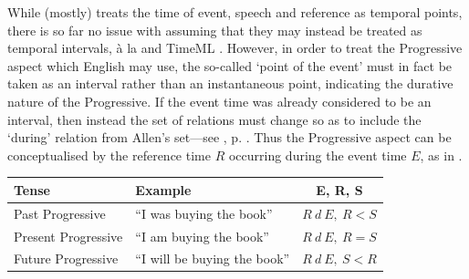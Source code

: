 \documentclass[a4paper,12pt,leqno,twoside]{article}
\begin{document}
While \citet{reichenbach1947elements} (mostly) treats the time of event, speech and reference as temporal points, there is so far no issue with assuming that they may instead be treated as temporal intervals, \`{a} la \citet{allen1983maintaining} and TimeML \citep{timeml2005timeml,sauri2006timeml}. However, in order to treat the Progressive aspect which English may use, the so-called `point of the event' must in fact be taken as an interval rather than an instantaneous point, indicating the durative nature of the Progressive. If the event time was already considered to be an interval, then instead the set of relations must change so as to include the `during' relation from Allen's set---see , p. \pageref{fig:allens-pictorial}. Thus the Progressive aspect can be conceptualised by the reference time $R$ occurring during the event time $E$, as in .
\begin{center}
	\begin{tabular}{|l l c|}
		\hline
		\textbf{Tense} & \textbf{Example} & \textbf{E, R, S}\\
		\hline
		Past Progressive & ``I was buying the book'' & $R ~d~ E,~ R < S$\\
		Present Progressive & ``I am buying the book'' & $R ~d~ E,~ R = S$\\
		Future Progressive & ``I will be buying the book'' & $R ~d~ E,~ S < R$\\
		\hline
	\end{tabular}
	\label{fig:reichenbach-progressive}
\end{center}
\end{document}
